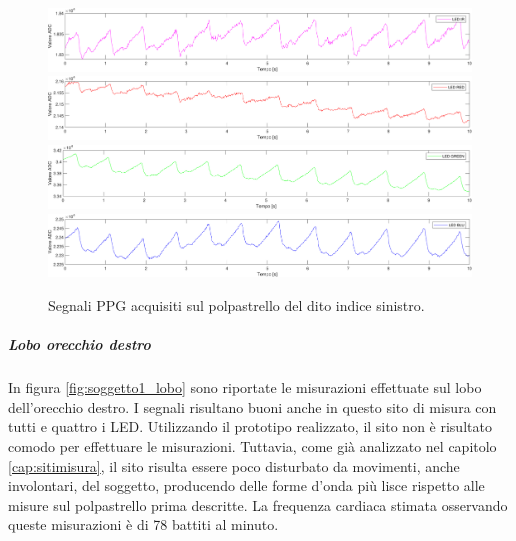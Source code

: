 \begin{figure}[h]
	\centering
	\includegraphics[width=1\linewidth]{ImageFiles/Misure Preliminari/Soggetto 1/polpastrello_ired}
	\includegraphics[width=1\linewidth]{ImageFiles/Misure Preliminari/Soggetto 1/polpastrello_red}
	\includegraphics[width=1\linewidth]{ImageFiles/Misure Preliminari/Soggetto 1/polpastrello_green}
	\includegraphics[width=1\linewidth]{ImageFiles/Misure Preliminari/Soggetto 1/polpastrello_blu}
	\caption{Segnali PPG acquisiti sul polpastrello del dito indice sinistro.}
	\label{fig:soggetto1_polpastrello}
\end{figure}

\clearpage

\subparagraph{Lobo orecchio destro}

In figura \ref{fig:soggetto1_lobo} sono riportate le misurazioni effettuate sul lobo dell'orecchio destro. I segnali risultano buoni anche in questo sito di misura con tutti e quattro i LED. Utilizzando il prototipo realizzato, il sito non è risultato comodo per effettuare le misurazioni. Tuttavia, come già analizzato nel capitolo \ref{cap:sitimisura}, il sito risulta essere poco disturbato da movimenti, anche involontari, del soggetto, producendo delle forme d'onda più lisce rispetto alle misure sul polpastrello prima descritte. La frequenza cardiaca stimata osservando queste misurazioni è di 78 battiti al minuto.

